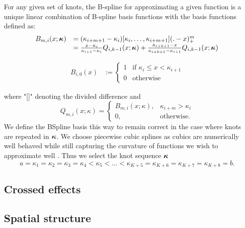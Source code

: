 For any given set of knots, the B-spline for approximating a given function is a unique linear combination
of B-spline basis functions with the basis functions defined as:
$$
\begin{array}{rl}
	B_{m, i}(x; {\boldsymbol \kappa}) &= (\kappa_{i + m  + 1} - \kappa_{i})[\kappa_i, \ldots, \kappa_{i + m + 1}](. - x)^m_+ \\
	&= \frac{x - \kappa_i}{\kappa_{i + 1} - \kappa_i} Q_{i, k-1} (x; {\boldsymbol \kappa}) + 
										\frac{\kappa_{i + k + 1} - x}{\kappa_{i + k + 1} - \kappa_{i + 1}} Q_{i, k-1} (x; {\boldsymbol \kappa})
\end{array}
$$

\begin{align*}
	B_{i, 0}(x) & := \begin{cases}                                                                                                        
	1           & \text{if } \kappa_i \leq x < \kappa_{i+1}                                                                                         \\
	0           & \text{otherwise}                                                                                                        
	\end{cases}
\end{align*}

where "[]" denoting the divided difference and
$$
Q_{m, i}(x; \kappa) =
\begin{cases}
B_{m, i}(x; \kappa),& \kappa_{i + m} > \kappa_i \\
0, & \text{otherwise}.
\end{cases}
$$
We define the BSpline basis this way to remain correct in the case where knots are repeated in ${\boldsymbol \kappa}$. We
choose piecewise cubic splines as cubics are numerically well behaved while still capturing the curvature of
functions we wish to approximate well \citep{Press:2007:NRE:1403886}. Thus we select the knot sequence
${\boldsymbol \kappa}$
$$
a = \kappa_1 = \kappa_2 = \kappa_3 = \kappa_4 < \kappa_5 < \ldots < \kappa_{K+5} = \kappa_{K+6} = \kappa_{K+7} = \kappa_{K+8} = b.
$$

\subsection{Crossed effects}
\subsection{Spatial structure}

